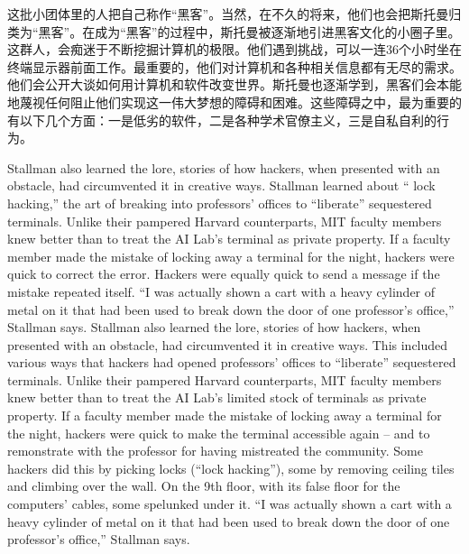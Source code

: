 \ifdefined\chs
这批小团体里的人把自己称作``黑客''。当然，在不久的将来，他们也会把斯托曼归类为``黑客''。在成为``黑客''的过程中，斯托曼被逐渐地引进黑客文化的小圈子里。这群人，会痴迷于不断挖掘计算机的极限。他们遇到挑战，可以一连36个小时坐在终端显示器前面工作。最重要的，他们对计算机和各种相关信息都有无尽的需求。他们会公开大谈如何用计算机和软件改变世界。斯托曼也逐渐学到，黑客们会本能地蔑视任何阻止他们实现这一伟大梦想的障碍和困难。这些障碍之中，最为重要的有以下几个方面：一是低劣的软件，二是各种学术官僚主义，三是自私自利的行为。
\fi

\ifdefined\eng
\ifdefined\vone
Stallman also learned the lore, stories of how hackers, when presented with an obstacle, had circumvented it in creative ways. Stallman learned about `` lock hacking,'' the art of breaking into professors' offices to ``liberate'' sequestered terminals. Unlike their pampered Harvard counterparts, MIT faculty members knew better than to treat the AI Lab's terminal as private property. If a faculty member made the mistake of locking away a terminal for the night, hackers were quick to correct the error. Hackers were equally quick to send a message if the mistake repeated itself. ``I was actually shown a cart with a heavy cylinder of metal on it that had been used to break down the door of one professor's office,'' Stallman says.
\fi
\ifdefined\vtwo
Stallman also learned the lore, stories of how hackers, when presented with an obstacle, had circumvented it in creative ways. This included various ways that hackers had opened professors' offices to ``liberate'' sequestered terminals. Unlike their pampered Harvard counterparts, MIT faculty members knew better than to treat the AI Lab's limited stock of terminals as private property. If a faculty member made the mistake of locking away a terminal for the night, hackers were quick to make the terminal accessible again -- and to remonstrate with the professor for having mistreated the community.  Some hackers did this by picking locks (``lock hacking''), some by removing ceiling tiles and climbing over the wall.  On the 9th floor, with its false floor for the computers' cables, some spelunked under it.  ``I was actually shown a cart with a heavy cylinder of metal on it that had been used to break down the door of one professor's office,'' Stallman says.
\fi
\fi


